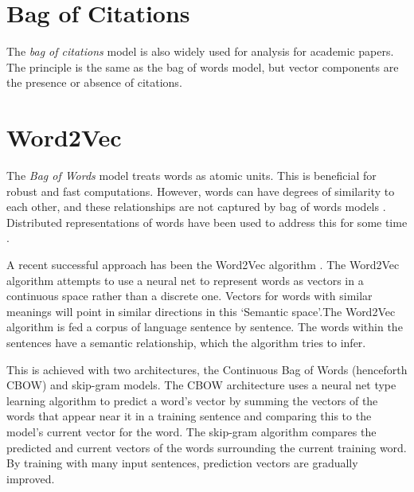 \section{Bag of Citations}
The \emph{bag of citations} model is also widely used for analysis for academic papers. The principle is the same as the bag of words model, but vector components are the presence or absence of citations.  
\section{Word2Vec}
\label{sec:WORD2VEC}
The \emph{Bag of Words} model treats words as atomic units. This is beneficial for robust and fast computations. However, words can have degrees of similarity to each other, and these relationships are not captured by bag of words models \cite{WORD2VECKINGQUEEN}. Distributed representations of words have been used to address this for some time \cite{olddistributed}.

 A recent successful approach has been the Word2Vec algorithm \cite{word2vec1} \cite{word2vec2}. The Word2Vec algorithm attempts to use a neural net to represent words as vectors in a continuous space rather than a discrete one. Vectors for words with similar meanings will point in similar directions in this `Semantic space'.The Word2Vec algorithm is fed a corpus of language sentence by sentence. The words within the sentences have a semantic relationship, which the algorithm tries to infer. 
 
This is achieved with two architectures, the Continuous Bag of Words (henceforth CBOW) and skip-gram models. The CBOW architecture uses a neural net type learning algorithm to predict a word's vector by summing the vectors of the words that appear near it in a training sentence and comparing this to the model's current vector for the word. The skip-gram algorithm compares the predicted and current vectors of the words surrounding the current training word. By training with many input sentences, prediction vectors are gradually improved. 

